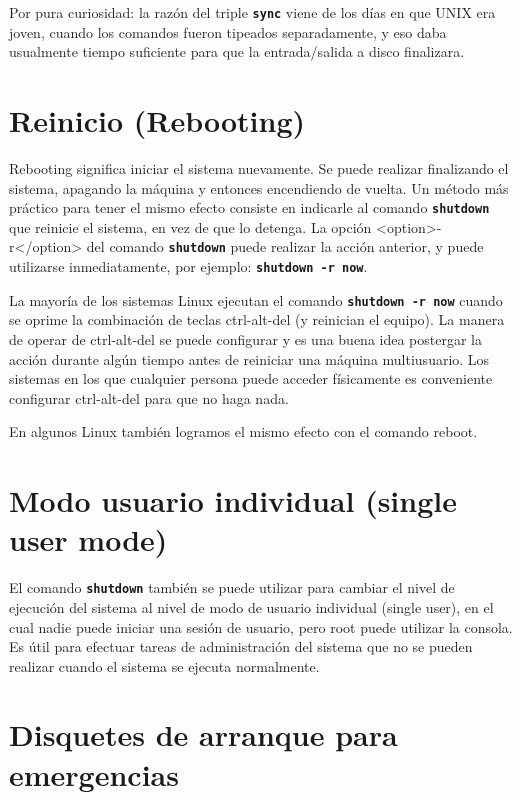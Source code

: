 \documentclass[12pt]{article}
\begin{document}
 Por pura curiosidad: la razón del triple \texttt{\textbf{sync}} viene de
los días en que UNIX era joven, cuando los comandos fueron tipeados
separadamente, y eso daba usualmente tiempo suficiente para que la
entrada/salida a disco finalizara.  



\section{ Reinicio (Rebooting)}

 Rebooting significa iniciar el sistema nuevamente. Se puede realizar
finalizando el sistema, apagando la máquina y entonces encendiendo de vuelta. Un
método más práctico para tener el mismo efecto consiste en indicarle al comando
\texttt{\textbf{shutdown}} que reinicie el sistema, en vez de que lo detenga.
La opción <option>-r</option> del comando \texttt{\textbf{shutdown}} puede
realizar la acción anterior, y puede utilizarse inmediatamente, por ejemplo:
\texttt{\textbf{shutdown -r now}}.  

 La mayoría de los sistemas Linux ejecutan el comando \texttt{\textbf{shutdown -r
now}} cuando se oprime la combinación de teclas ctrl-alt-del (y
reinician el equipo). La manera de operar de ctrl-alt-del se puede configurar y
es una buena idea postergar la acción durante algún tiempo antes de reiniciar
una máquina multiusuario. Los sistemas en los que cualquier persona puede
acceder físicamente es conveniente configurar ctrl-alt-del para que no haga
nada.

En algunos Linux también logramos el mismo efecto con el comando reboot.





\section{ Modo usuario individual (single user mode)}

 El comando \texttt{\textbf{shutdown}} también se puede utilizar para
cambiar el nivel de ejecución del sistema al nivel de modo de usuario individual
(single user), en el cual nadie puede iniciar una sesión de usuario, pero root
puede utilizar la consola. Es útil para efectuar tareas de administración del
sistema que no se pueden realizar cuando el sistema se ejecuta normalmente.




\section{ Disquetes de arranque para emergencias}
\end{document}
